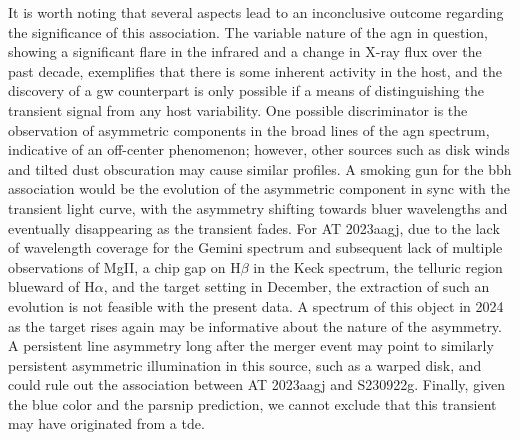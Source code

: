 \documentclass[twocolumn]{aastex631}
\newcommand{\gweventid}{S230922g\xspace}
\begin{document}
It is worth noting that several aspects lead to an inconclusive outcome regarding the significance of this association.
The variable nature of the \gls{agn} in question, showing a significant flare in the infrared and a change in X-ray flux over the past decade, exemplifies that there is some inherent activity in the host, and the discovery of a \gls{gw} counterpart is only possible if a means of distinguishing the transient signal from any host variability.
One possible discriminator is the observation of asymmetric components in the broad lines of the \gls{agn} spectrum, indicative of an off-center phenomenon; however, other sources such as disk winds and tilted dust obscuration may cause similar profiles.
A smoking gun for the \gls{bbh} association would be the evolution of the asymmetric component in sync with the transient light curve, with the asymmetry shifting towards bluer wavelengths and eventually disappearing as the transient fades.
For AT 2023aagj, due to the lack of wavelength coverage for the Gemini spectrum and subsequent lack of multiple observations of MgII, a chip gap on H$\beta$ in the Keck spectrum, the telluric region blueward of H$\alpha$, and the target setting in December, the extraction of such an evolution is not feasible with the present data.
A spectrum of this object in 2024 as the target rises again may be informative about the nature of the asymmetry.
A persistent line asymmetry long after the merger event may point to similarly persistent asymmetric illumination in this source, such as a warped disk, and could rule out the association between AT 2023aagj and \gweventid.
Finally, given the blue color and the \gls{parsnip} prediction, we cannot exclude that this transient may have originated from a \gls{tde}.
\end{document}
